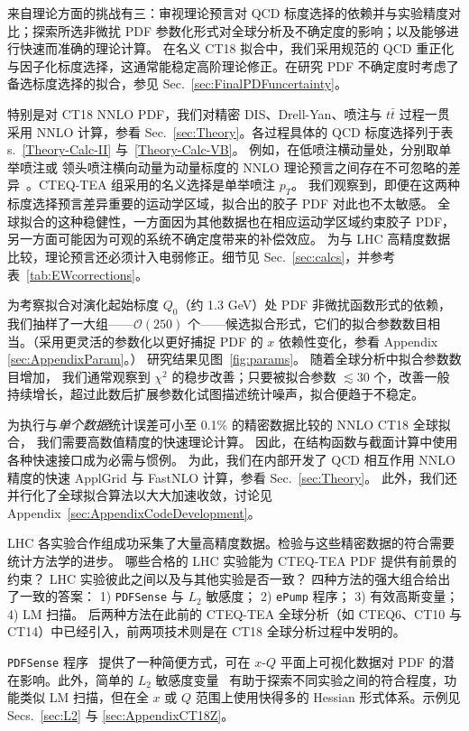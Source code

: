 来自理论方面的挑战有三：审视理论预言对 QCD 标度选择的依赖并与实验精度对比；探索所选非微扰 PDF 参数化形式对全球分析及不确定度的影响；以及能够进行快速而准确的理论计算。
在名义 CT18 拟合中，我们采用规范的
QCD 重正化与因子化标度选择，这通常能稳定高阶理论修正。在研究 PDF 不确定度时考虑了备选标度选择的拟合，参见 Sec.~\ref{sec:FinalPDFuncertainty}。

特别是对 CT18 NNLO PDF，我们对精密 DIS、Drell-Yan、喷注与 $t \bar t$ 过程一贯采用 NNLO 计算，参看 Sec.~\ref{sec:Theory}。各过程具体的 QCD 标度选择列于表s.~\ref{Theory-Calc-II} 与~\ref{Theory-Calc-VB}。
例如，在低喷注横动量处，分别取单举喷注或
领头喷注横向动量为动量标度的 NNLO 理论预言之间存在不可忽略的差异~\cite{Currie:2018xkj}。CTEQ-TEA 组采用的名义选择是单举喷注 $p_T$。
我们观察到，即便在这两种标度选择预言差异重要的运动学区域，拟合出的胶子 PDF 对此也不太敏感。
全球拟合的这种稳健性，一方面因为其他数据也在相应运动学区域约束胶子 PDF，另一方面可能因为可观的系统不确定度带来的补偿效应。
为与 LHC 高精度数据比较，理论预言还必须计入电弱修正。细节见 Sec.~\ref{sec:calcs}，并参考表~\ref{tab:EWcorrections}。


为考察拟合对演化起始标度 $Q_0$（约 1.3 GeV）处 PDF 非微扰函数形式的依赖，我们抽样了一大组——$\mathcal{O}(250)$ 个——候选拟合形式，它们的拟合参数数目相当。（采用更灵活的参数化以更好捕捉 PDF 的 $x$ 依赖性变化，参看 Appendix \ref{sec:AppendixParam}。）
研究结果见图~\ref{fig:params}。
随着全球分析中拟合参数数目增加，
我们通常观察到 $\chi^2$ 的稳步改善；只要被拟合参数 $\lesssim\! 30$ 个，改善一般持续增长，超过此数后扩展参数化试图描述统计噪声，拟合便趋于不稳定。


为执行与{\it 单个数据}统计误差可小至 0.1\% 的精密数据比较的 NNLO CT18 全球拟合，
我们需要高数值精度的快速理论计算。
因此，在结构函数与截面计算中使用各种快速接口成为必需与惯例。
为此，我们在内部开发了 QCD 相互作用 NNLO 精度的快速 ApplGrid 与 FastNLO 计算，参看 Sec.~\ref{sec:Theory}。
此外，我们还并行化了全球拟合算法以大大加速收敛，讨论见 Appendix~\ref{sec:AppendixCodeDevelopment}。


LHC 各实验合作组成功采集了大量高精度数据。检验与这些精密数据的符合需要统计方法学的进步。
哪些合格的 LHC 实验能为 CTEQ-TEA PDF 提供有前景的约束？
LHC 实验彼此之间以及与其他实验是否一致？
四种方法的强大组合给出了一致的答案：
1) \texttt{PDFSense} 与 $L_2$ 敏感度；
2) \texttt{ePump} 程序；
3) 有效高斯变量；
4) LM 扫描。
后两种方法在此前的 CTEQ-TEA 全球分析（如 CTEQ6、CT10 与 CT14）中已经引入，前两项技术则是在 CT18 全球分析过程中发明的。

\texttt{PDFSense} 程序~\cite{Wang:2018heo} 提供了一种简便方式，可在 $x$-$Q$ 平面上可视化数据对 PDF 的潜在影响。此外，简单的 $L_2$ 敏感度变量~\cite{Hobbs:2019gob} 有助于探索不同实验之间的符合程度，功能类似 LM 扫描，但在全 $x$ 或 $Q$ 范围上使用快得多的 Hessian 形式体系。示例见 Secs.~\ref{sec:L2} 与 \ref{sec:AppendixCT18Z}。

